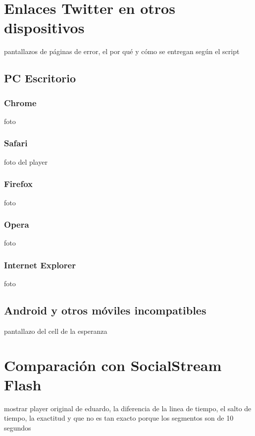\section{Enlaces Twitter en otros dispositivos}
	pantallazos de páginas de error, el por qué y cómo se entregan según el script
  \subsection{PC Escritorio}
    \subsubsection{Chrome}
    foto
    \subsubsection{Safari}
    foto del player
    \subsubsection{Firefox}
    foto
    \subsubsection{Opera}
    foto
    \subsubsection{Internet Explorer}
    foto
  \subsection{Android y otros móviles incompatibles}
  pantallazo del cell de la esperanza
\section{Comparación con SocialStream Flash}
mostrar player original de eduardo, la diferencia de la linea de tiempo, el salto de tiempo, la exactitud y que no es tan exacto porque los segmentos son de 10 segundos
